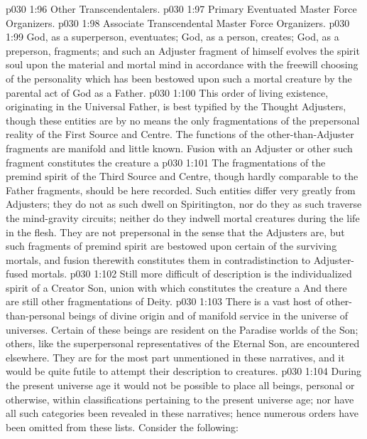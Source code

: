 \vs p030 1:96 \bibnobreakspace Other Transcendentalers.
\vs p030 1:97 \bibnobreakspace Primary Eventuated Master Force Organizers.
\vs p030 1:98 \bibnobreakspace Associate Transcendental Master Force Organizers.
\vs p030 1:99 \pc God, as a superperson, eventuates; God, as a person, creates; God, as a preperson, fragments; and such an Adjuster fragment of himself evolves the spirit soul upon the material and mortal mind in accordance with the freewill choosing of the personality which has been bestowed upon such a mortal creature by the parental act of God as a Father.
\vsetspace
\vs p030 1:100 \bibnobreakspace {} This order of living existence, originating in the Universal Father, is best typified by the Thought Adjusters, though these entities are by no means the only fragmentations of the prepersonal reality of the First Source and Centre. The functions of the other\hyp{}than\hyp{}Adjuster fragments are manifold and little known. Fusion with an Adjuster or other such fragment constitutes the creature a 
\vs p030 1:101 The fragmentations of the premind spirit of the Third Source and Centre, though hardly comparable to the Father fragments, should be here recorded. Such entities differ very greatly from Adjusters; they do not as such dwell on Spiritington, nor do they as such traverse the mind\hyp{}gravity circuits; neither do they indwell mortal creatures during the life in the flesh. They are not prepersonal in the sense that the Adjusters are, but such fragments of premind spirit are bestowed upon certain of the surviving mortals, and fusion therewith constitutes them  in contradistinction to Adjuster\hyp{}fused mortals.
\vs p030 1:102 Still more difficult of description is the individualized spirit of a Creator Son, union with which constitutes the creature a  And there are still other fragmentations of Deity.
\vsetspace
\vs p030 1:103 \bibnobreakspace {} There is a vast host of other\hyp{}than\hyp{}personal beings of divine origin and of manifold service in the universe of universes. Certain of these beings are resident on the Paradise worlds of the Son; others, like the superpersonal representatives of the Eternal Son, are encountered elsewhere. They are for the most part unmentioned in these narratives, and it would be quite futile to attempt their description to  creatures.
\vsetspace
\vs p030 1:104 \kern4pt\bibnobreakspace {} During the present universe age it would not be possible to place all beings, personal or otherwise, within classifications pertaining to the present universe age; nor have all such categories been revealed in these narratives; hence numerous orders have been omitted from these lists. Consider the following:

